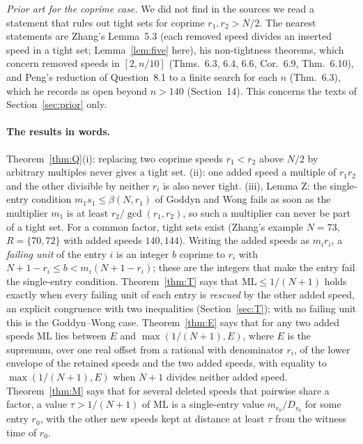 \documentclass[11pt]{article}
\theoremstyle{definition}
\theoremstyle{remark}
\newcommand{\ML}{\mathrm{ML}}
\begin{document}
\emph{Prior art for the coprime case.} We did not find in the sources we read a statement that rules out tight sets for coprime $r_1,r_2>N/2$. The nearest statements are Zhang's Lemma~5.3 (each removed speed divides an inserted speed in a tight set; Lemma~\ref{lem:five} here), his non-tightness theorems, which concern removed speeds in $[2,n/10]$ (Thms.~6.3, 6.4, 6.6, Cor.~6.9, Thm.~6.10), and Peng's reduction of Question~8.1 to a finite search for each $n$ (Thm.~6.3), which he records as open beyond $n>140$ (Section~14). This concerns the texts of Section~\ref{sec:prior} only.

\paragraph{The results in words.} Theorem~\ref{thm:Q}(i): replacing two coprime speeds $r_1<r_2$ above $N/2$ by arbitrary multiples never gives a tight set. (ii): one added speed a multiple of $r_1r_2$ and the other divisible by neither $r_i$ is also never tight. (iii), Lemma Z: the single-entry condition $m_1s_1\le\beta(N,r_1)$ of Goddyn and Wong fails as soon as the multiplier $m_1$ is at least $r_2/\gcd(r_1,r_2)$, so such a multiplier can never be part of a tight set. For a common factor, tight sets exist (Zhang's example $N=73$, $R=\{70,72\}$ with added speeds $140,144$). Writing the added speeds as $m_ir_i$, a \emph{failing unit} of the entry $i$ is an integer $b$ coprime to $r_i$ with $N+1-r_i\le b<m_i(N+1-r_i)$; these are the integers that make the entry fail the single-entry condition. Theorem~\ref{thm:T} says that $\ML\le1/(N+1)$ holds exactly when every failing unit of each entry is \emph{rescued} by the other added speed, an explicit congruence with two inequalities (Section~\ref{sec:T}); with no failing unit this is the Goddyn--Wong case. Theorem~\ref{thm:E} says that for any two added speeds $\ML$ lies between $E$ and $\max(1/(N+1),E)$, where $E$ is the supremum, over one real offset from a rational with denominator $r_i$, of the lower envelope of the retained speeds and the two added speeds, with equality to $\max(1/(N+1),E)$ when $N+1$ divides neither added speed. Theorem~\ref{thm:M} says that for several deleted speeds that pairwise share a factor, a value $\tau>1/(N+1)$ of $\ML$ is a single-entry value $m_{r_0}/D_{r_0}$ for some entry $r_0$, with the other new speeds kept at distance at least $\tau$ from the witness time of $r_0$.
\end{document}
